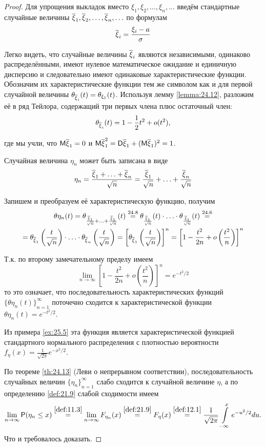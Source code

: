 \begin{proof}
Для упрощения выкладок вместо $\xi_1 , \xi_2 , \ldots , \xi_n , \ldots$
введём стандартные случайные величины $\oxi_1 , \oxi_2 , \ldots , \oxi_n , \ldots$ по формулам
$$
\oxi_i=\frac{\xi_i-a}{\sigma}
$$

Легко видеть, что случайные величины $\oxi_i$ являются независимыми, одинаково распределёнными, имеют нулевое математическое ожидание и единичную дисперсию и следовательно имеют одинаковые характеристические функции. Обозначим их характеристические функции тем же символом как и для первой случайной величины $\theta_{\oxi_i}(t) = \theta_{\xi_1} (t)$. Используя лемму \ref{lemma:24.12}, разложим её в ряд Тейлора, содержащий три первых члена плюс остаточный член:
$$
\theta_{\oxi_i}(t)=1-\frac{1}{2}t^2+o(t^2),
$$

где мы учли, что $\M\oxi_1 = 0$ и $\M\oxi_1^2 = \D\oxi_1 + (\M\oxi_1)^2 = 1$.

Случайная величина $\eta_n$ может быть записана в виде
$$\eta_n =\frac{\oxi_1+\ldots+\oxi_n}{\sqrt{n}}=
\frac{\oxi_1}{\sqrt{n}}+\ldots+\frac{\oxi_n}{\sqrt{n}}
$$

Запишем и преобразуем её характеристическую функцию, получим
\begin{gather*}
\theta\eta_n (t) = \theta_{\frac{\oxi_1}{\sqrt{n}} + \ldots + \frac{\oxi_1}{\sqrt{n}}}(t)
\stackrel{24.8}{=}
\theta_{\frac{\oxi_1}{\sqrt{n}}}(t)\cdot\ldots\cdot \theta_{\frac{\oxi_1}{\sqrt{n}}}(t)
\stackrel{24.6}{=}\\=
\theta_{\oxi_1}\left(\frac{t}{\sqrt{n}}\right)
	\cdot\ldots\cdot
\theta_{\oxi_n}\left(\frac{t}{\sqrt{n}}\right)=
\left[
	\theta_{\oxi_1}\left(\frac{t}{\sqrt{n}}\right)
\right]^n=
\left[
	1-\frac{t^2}{2n}+o\left(\frac{t^2}{n}\right)
\right]^n
\end{gather*}

Т.к. по второму замечательному пределу имеем
$$
\lim\limits_{n\to\infty}
\left[
	1-\frac{t^2}{2n}+o\left(\frac{t^2}{n}\right)
\right]^n=e^{-t^2/2}
$$
то это означает, что последовательность характеристических функций
${\{\theta\eta_n (t)\}}_{n=1}^\infty$ поточечно сходится к характеристической функции 
${\theta\eta_n (t)}=e^{-t^2/2}$.

Из примера \ref{ex:25.5} эта функция является характеристической функцией стандартного нормального распределения с плотностью вероятности
$f_\eta (x) = \frac{1}{\sqrt{2\pi}}e^{-x^2/2}$. 

По теореме \ref{th:24.13} (Леви о непрерывном соответствии), последовательность случайных величин ${\{\eta_n \}}^\infty_{n=1}$ слабо сходится к случайной
величине $\eta$, а по определению \ref{def:21.9} слабой сходимости имеем
\begin{gather*}
\lim\limits_{n\to\infty} \P(\eta_n \leq x)
\stackrel{\ref{def:11.3}}{=}
\lim\limits_{n\to\infty} F_{\eta_n}(x)
\stackrel{\ref{def:21.9}}{=}
F_\eta(x)
\stackrel{\ref{def:12.1}}{=}
\frac{1}{\sqrt{2\pi}}\int\limits_{-\infty}^x e^{-u^2/2} du.
\end{gather*}
Что и требовалось доказать.
\end{proof}

